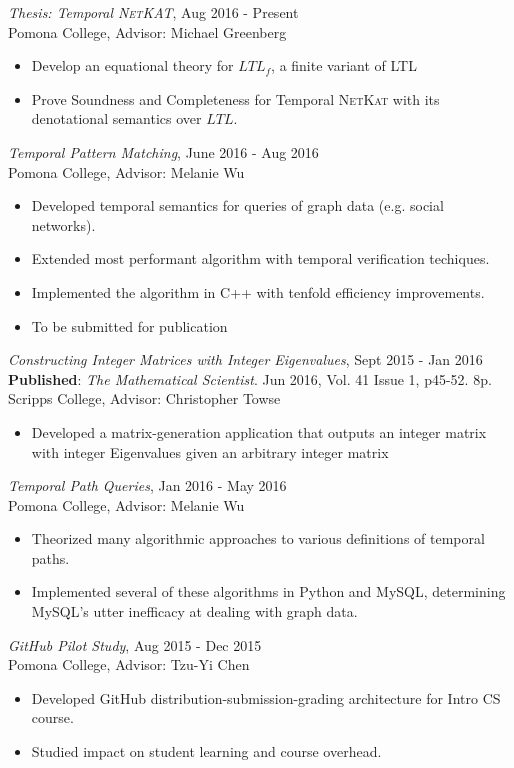 {\sl Thesis: Temporal \textsc{NetKAT}}, \hfill  Aug 2016 - Present \\
Pomona College, Advisor: Michael Greenberg
\begin{itemize} \itemsep -2pt
  \item Develop an equational theory for $LTL_f$, a finite variant of LTL
  \item Prove Soundness and Completeness for Temporal \textsc{NetKat} with its
    denotational semantics over $LTL$.
\end{itemize}

{\sl Temporal Pattern Matching}, \hfill June 2016 - Aug 2016 \\
Pomona College, Advisor: Melanie Wu
\begin{itemize} \itemsep -2pt
  \item Developed temporal semantics for queries of graph data (e.g. social networks).
  \item Extended most performant algorithm with temporal verification techiques.
  \item Implemented the algorithm in C++ with tenfold efficiency improvements.
  \item To be submitted for publication
\end{itemize}

{\sl Constructing Integer Matrices with Integer Eigenvalues}, \hfill Sept 2015 - Jan 2016\\
\textbf{Published}: \textit{The Mathematical Scientist}. Jun 2016, Vol. 41 Issue 1, p45-52. 8p. \\
Scripps College, Advisor: Christopher Towse
\begin{itemize} \itemsep -2pt
  \item Developed a matrix-generation application that outputs an integer matrix
    with integer Eigenvalues given an arbitrary integer matrix
\end{itemize}


{\sl Temporal Path Queries}, \hfill Jan 2016 - May 2016 \\
Pomona College, Advisor: Melanie Wu
\begin{itemize} \itemsep -2pt
  \item Theorized many algorithmic approaches to various definitions of temporal paths.
  \item Implemented several of these algorithms in Python and MySQL, determining
    MySQL's utter inefficacy at dealing with graph data.
\end{itemize}

{\sl GitHub Pilot Study}, \hfill Aug 2015 - Dec 2015 \\
Pomona College, Advisor: Tzu-Yi Chen
\begin{itemize}\itemsep -2pt
  \item Developed GitHub distribution-submission-grading architecture for Intro CS course.
  \item Studied impact on student learning and course overhead.
\end{itemize}

